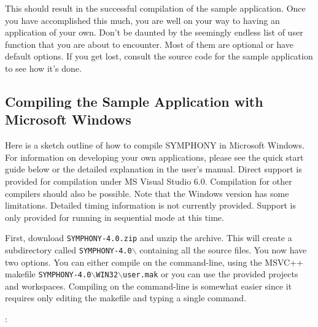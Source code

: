 \noindent This should result in the successful compilation of the sample
application. Once you have accomplished this much, you are well on
your way to having an application of your own. Don't be daunted by the
seemingly endless list of user function that you are about to
encounter. Most of them are optional or have default options. If you
get lost, consult the source code for the sample application to see
how it's done.

\subsection{Compiling the Sample Application with Microsoft Windows}
\label{getting_started_windows}

Here is a sketch outline of how to compile SYMPHONY in Microsoft Windows. For
information on developing your own applications, please see the quick start
guide below or the detailed explanation in the user's manual. Direct support
is provided for compilation under MS Visual Studio 6.0. Compilation for other
compilers should also be possible. Note that the Windows version has some
limitations. Detailed timing information is not currently provided.  Support
is only provided for running in sequential mode at this time.

First, download \texttt{SYMPHONY-4.0.zip} and unzip the archive. This will
create a subdirectory called \texttt{SYMPHONY-4.0$\backslash$} containing all
the source files. You now have two options. You can either compile on the
command-line, using the MSVC++ makefile 
\texttt{SYMPHONY-4.0$\backslash$WIN32$\backslash$user.mak} or you
can use the provided projects and workspaces. Compiling on the command-line is
somewhat easier since it requires only editing the makefile and typing a
single command.

:

